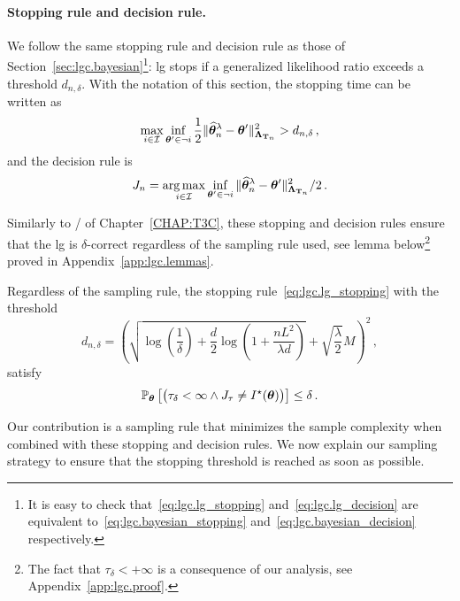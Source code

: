 \paragraph{Stopping rule and decision rule.}
We follow the same stopping rule and decision rule as those of Section~\ref{sec:lgc.bayesian}\footnote{It is easy to check that~\eqref{eq:lgc.lg_stopping} and~\eqref{eq:lgc.lg_decision} are equivalent to~\eqref{eq:lgc.bayesian_stopping} and~\eqref{eq:lgc.bayesian_decision} respectively.}: \gls{lg} stops if a generalized likelihood ratio exceeds a threshold $d_{n,\delta}$. With the notation of this section, the stopping time can be written as
\begin{align}\label{eq:lgc.lg_stopping}
    \max_{i\in \mathcal{I}} \inf_{{\boldsymbol \theta}' \in \neg i}\frac{1}{2}\Vert \widehat{{\boldsymbol \theta}}_n^\lambda - {\boldsymbol \theta}' \Vert^2_{{\boldsymbol \Lambda}_{{\bf T}_n}} > d_{n,\delta}\,,
\end{align}
and the decision rule is 
\begin{align}\label{eq:lgc.lg_decision}
    J_n = \operatorname*{arg\,max}_{i\in \mathcal{I}} \inf_{{\boldsymbol \theta}' \in \neg i}\Vert \widehat{{\boldsymbol \theta}}_n^\lambda - {\boldsymbol \theta}' \Vert^2_{{\boldsymbol \Lambda}_{{\bf T}_n}}/2\,.
\end{align}

Similarly to \TCC{}/\TTTS{} of Chapter~\ref{CHAP:T3C}, these stopping and decision rules ensure that the \gls{lg} is $\delta$-correct regardless of the sampling rule used, see lemma below\footnote{The fact that $\tau_\delta <+\infty$ is a consequence of our analysis, see Appendix~\ref{app:lgc.proof}.} proved in Appendix~\ref{app:lgc.lemmas}.

\begin{lemma}\label{lemma:lgc.pac}
\begin{leftbar}[lemmabar]
Regardless of the sampling rule, the stopping rule~\eqref{eq:lgc.lg_stopping} with the threshold
\begin{equation} \label{eq:def_beta}
    d_{n,\delta} =\left( \sqrt{\log\left( \frac{1}{\delta}\right)+\frac{d}{2}\log\left(1+\frac{n L^2}{\lambda d} \right)} +\sqrt{\frac{\lambda}{2}}M\right)^2\,,
\end{equation}
satisfy
\[
    \mathbb{P}_{\boldsymbol \theta}\left[\big(\tau_{\delta} < \infty \wedge J_\tau \neq I^\star({\boldsymbol \theta})\big)\right] \leq \delta\,.
\]
\end{leftbar}
\end{lemma}
Our contribution is a sampling rule that minimizes the sample complexity when combined with these stopping and decision rules.
We now explain our sampling strategy to ensure that the stopping threshold is reached as soon as possible.

